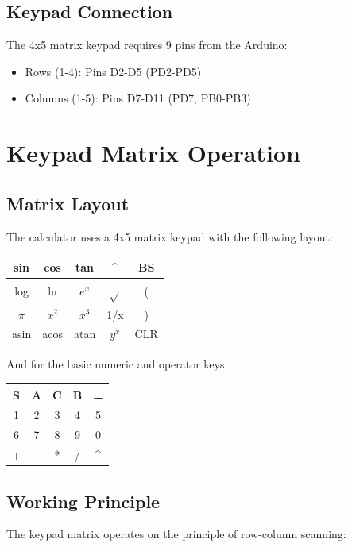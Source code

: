 \documentclass[12pt]{article}
\begin{document}
\subsection*{Keypad Connection}
The 4x5 matrix keypad requires 9 pins from the Arduino:
\begin{itemize}
\item Rows (1-4): Pins D2-D5 (PD2-PD5)
\item Columns (1-5): Pins D7-D11 (PD7, PB0-PB3)
\end{itemize}

\section{Keypad Matrix Operation}

\subsection*{Matrix Layout}
The calculator uses a 4x5 matrix keypad with the following layout:

\begin{center}
\begin{tabular}{|c|c|c|c|c|}
\hline
sin & cos & tan & \textasciicircum & BS \\
\hline
log & ln & $e^x$ & $\sqrt{}$ & ( \\
\hline
$\pi$ & $x^2$ & $x^3$ & 1/x & ) \\
\hline
asin & acos & atan & $y^x$ & CLR \\
\hline
\end{tabular}
\end{center}

And for the basic numeric and operator keys:

\begin{center}
\begin{tabular}{|c|c|c|c|c|}
\hline
S & A & C & B & = \\
\hline
1 & 2 & 3 & 4 & 5 \\
\hline
6 & 7 & 8 & 9 & 0 \\
\hline
+ & - & * & / & \textasciicircum \\
\hline
\end{tabular}
\end{center}

\subsection*{Working Principle}
The keypad matrix operates on the principle of row-column scanning:
\end{document}

